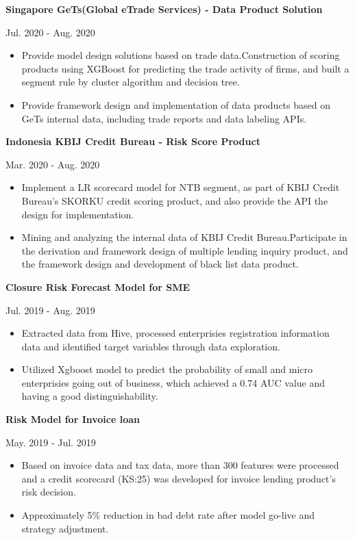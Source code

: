 \documentclass[letterpaper,10pt]{article}
\newcommand{\resumeItem}[2]{
  \item\small{
    \textbf{#1}{ #2 \vspace{-2pt}}
  }
}
\newcommand{\resumeSubItem}[2]{\resumeItem{#1}{#2}\vspace{-4pt}}
\begin{document}
\begin{CJK*}{UTF8}{gkai}
{\begin{itemize}
        \end{itemize}
     }
     \resumeSubItem{Singapore GeTs(Global eTrade Services) - Data Product Solution}
        {   \hfill{Jul. 2020 - Aug. 2020}
        \vspace{-5pt}
        \begin{itemize}
            \item Provide model design solutions based on trade data.Construction of scoring products using XGBoost for predicting the trade activity of firms, and built a segment rule by cluster algorithm and decision tree.
             \item Provide framework design and implementation of data products based on GeTs internal data, including trade reports and data labeling APIs.
            
        \end{itemize}
     }

    \resumeSubItem{Indonesia KBIJ Credit Bureau - Risk Score Product}
        {   \hfill{Mar. 2020 - Aug. 2020}
        \vspace{-5pt}
        \begin{itemize}
            \item 
            Implement a LR scorecard model for NTB segment, as part of KBIJ Credit Bureau's SKORKU credit scoring product, and also provide the API the design for implementation.
            \item Mining and analyzing the internal data of KBIJ Credit Bureau.Participate in the derivation and framework design of multiple lending inquiry product, and the framework design and development of black list data product.
            
        \end{itemize}
     }
    \resumeSubItem{Closure Risk Forecast Model for SME}
     {\vspace{-5pt} \hfill{Jul. 2019 - Aug. 2019}
        \begin{itemize}
            \item Extracted data from Hive, processed enterprisies registration information data and identified target variables through data exploration.
            \item Utilized Xgboost model to predict the probability of small and micro enterprisies going out of business, which achieved a 0.74 AUC value and having a good distinguishability.

        \end{itemize}
     }
    \resumeSubItem{Risk Model for Invoice loan}
     {\vspace{-5pt} \hfill{May. 2019 - Jul. 2019}
        \begin{itemize}
            \item Based on invoice data and tax data, more than 300 features were processed and a credit scorecard (KS:25) was developed for invoice lending product's risk decision.
            \item Approximately 5\% reduction in bad debt rate after model go-live and strategy adjustment.


\end{itemize}}
\end{CJK*}
\end{document}
